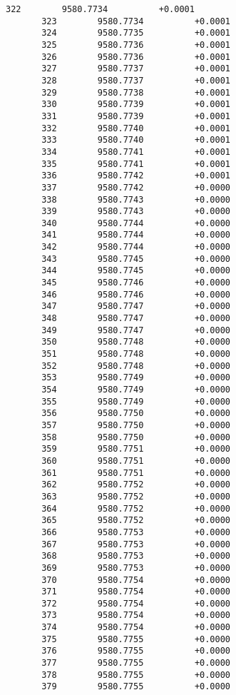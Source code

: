 \documentclass[11pt]{article}
\begin{document}
\begin{Verbatim}[commandchars=\\\{\}]
       322        9580.7734          +0.0001
       323        9580.7734          +0.0001
       324        9580.7735          +0.0001
       325        9580.7736          +0.0001
       326        9580.7736          +0.0001
       327        9580.7737          +0.0001
       328        9580.7737          +0.0001
       329        9580.7738          +0.0001
       330        9580.7739          +0.0001
       331        9580.7739          +0.0001
       332        9580.7740          +0.0001
       333        9580.7740          +0.0001
       334        9580.7741          +0.0001
       335        9580.7741          +0.0001
       336        9580.7742          +0.0001
       337        9580.7742          +0.0000
       338        9580.7743          +0.0000
       339        9580.7743          +0.0000
       340        9580.7744          +0.0000
       341        9580.7744          +0.0000
       342        9580.7744          +0.0000
       343        9580.7745          +0.0000
       344        9580.7745          +0.0000
       345        9580.7746          +0.0000
       346        9580.7746          +0.0000
       347        9580.7747          +0.0000
       348        9580.7747          +0.0000
       349        9580.7747          +0.0000
       350        9580.7748          +0.0000
       351        9580.7748          +0.0000
       352        9580.7748          +0.0000
       353        9580.7749          +0.0000
       354        9580.7749          +0.0000
       355        9580.7749          +0.0000
       356        9580.7750          +0.0000
       357        9580.7750          +0.0000
       358        9580.7750          +0.0000
       359        9580.7751          +0.0000
       360        9580.7751          +0.0000
       361        9580.7751          +0.0000
       362        9580.7752          +0.0000
       363        9580.7752          +0.0000
       364        9580.7752          +0.0000
       365        9580.7752          +0.0000
       366        9580.7753          +0.0000
       367        9580.7753          +0.0000
       368        9580.7753          +0.0000
       369        9580.7753          +0.0000
       370        9580.7754          +0.0000
       371        9580.7754          +0.0000
       372        9580.7754          +0.0000
       373        9580.7754          +0.0000
       374        9580.7754          +0.0000
       375        9580.7755          +0.0000
       376        9580.7755          +0.0000
       377        9580.7755          +0.0000
       378        9580.7755          +0.0000
       379        9580.7755          +0.0000

\end{Verbatim}
\end{document}
